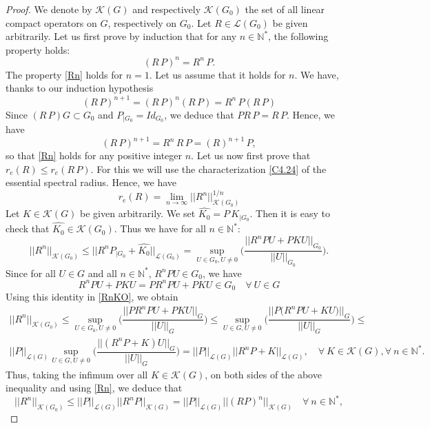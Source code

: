 \documentclass[10pt, english]{article}
\begin{document}
{\begin{proof}
We denote by $\mathcal{K}(G)$ and respectively $\mathcal{K}(G_0)$ the set of all linear compact operators on $G$, respectively on $G_0$. Let $R \in \mathcal{L}(G_0)$ be given arbitrarily.
Let us first prove by induction that for any $n \in \mathbb{N}^{\ast}$, the following property holds:
\begin{equation}\label{Rn}
(R\,P)^n=R^n\, P. 
\end{equation}
The property \eqref{Rn} holds for $n=1$. Let us assume that it holds for $n$. We have, thanks to our induction hypothesis
$$
(R\,P)^{n+1}= (R\,P)^n (R\,P)= R^n\, P (R\,P)
$$
Since $(R\,P)G \subset G_0$ and $P_{|G_0}=Id_{G_0}$, we deduce that $PR\,P=R\,P$. Hence, we have
$$
(R\,P)^{n+1}= R^n\, R\,P= (R)^{n+1}\,P,
$$
so that \eqref{Rn} holds for any positive integer $n$. 
Let us now first prove that $r_e(R) \leqslant r_e(R\,P)$. For this we will use the characterization \eqref{C4.24} of the essential spectral radius. Hence, we have
$$
r_e(R)=\lim_{n \rightarrow \infty}||R^n||_{\mathcal{K}(G_0)}^{1/n}
$$
Let $K \in \mathcal{K}(G)$ be given arbitrarily. We set $\widehat{K_0}=P\, K_{|G_0}$. Then it is easy to check that $\widehat{K_0} \in \mathcal{K}(G_0)$. Thus we have for all $n \in \mathbb{N}^{\ast}$:
\begin{equation}\label{RnKO}
||R^n||_{\mathcal{K}(G_0)} \leqslant ||R^n P_{|G_0} + \widehat{K_0}||_{\mathcal{L}(G_0)} =\sup_{U \in G_0, U \neq 0} \Big(\dfrac{||R^nPU + P K U||_{G_0}}
{||U||_{G_0}}\Big).
\end{equation}
Since for all $U \in G$ and all $n \in \mathbb{N}^{\ast}$, $R^nPU \in G_0$, we have
$$
R^nPU + P K U=PR^nPU + P K U \in G_0 \quad \forall \ U \in G
$$
Using this identity in \eqref{RnKO}, we obtain
\begin{multline*}
||R^n||_{\mathcal{K}(G_0)} \leqslant \sup_{U \in G_0, U \neq 0} \Big(\dfrac{||PR^nPU + P K U||_{G}}
{||U||_{G}}\Big) \leqslant 
\sup_{U \in G, U \neq 0} \Big(\dfrac{||P\big(R^nPU + K U\big)||_{G}}
{||U||_{G}}\Big) \leqslant \\
||P||_{\mathcal{L}(G)} \sup_{U \in G, U \neq 0} \Big(\dfrac{||(R^nP+K)U||_{G}}
{||U||_{G}}\Big)= ||P||_{\mathcal{L}(G)} ||R^nP + K ||_{\mathcal{L}(G)}, \quad \forall \ K \in \mathcal{K}(G), \forall \  n \in \mathbb{N}^{\ast}.
\end{multline*}
Thus, taking the infimum over all $K \in \mathcal{K}(G)$, on both sides of the above inequality and using \eqref{Rn}, we deduce that
$$
||R^n||_{\mathcal{K}(G_0)} \leqslant ||P||_{\mathcal{L}(G)} ||R^nP||_{\mathcal{K}(G)}= ||P||_{\mathcal{L}(G)} ||(RP)^n||_{\mathcal{K}(G)} \quad \forall \ n \in \mathbb{N}^{\ast}, 
$$
\end{proof}}
\end{document}
